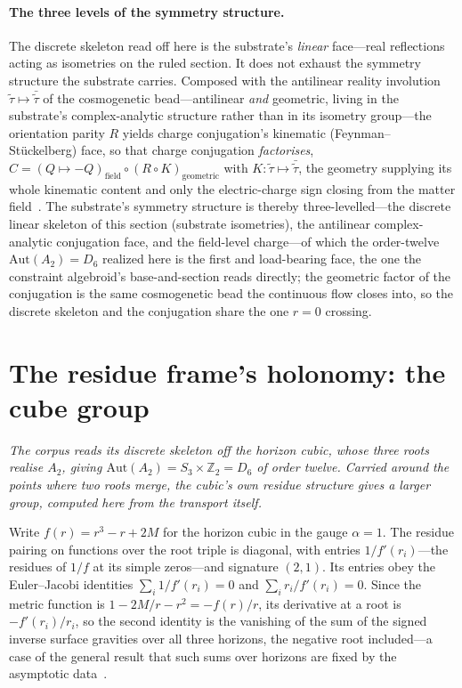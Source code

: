 \documentclass[11pt,a4paper]{article}
\theoremstyle{plain}
\theoremstyle{definition}
\theoremstyle{remark}
\begin{document}
\paragraph{The three levels of the symmetry structure.} The discrete skeleton read off here is the substrate's \emph{linear} face---real reflections acting as isometries on the ruled section. It does not exhaust the symmetry structure the substrate carries. Composed with the antilinear reality involution $\tilde\tau\mapsto\bar{\tilde\tau}$ of the cosmogenetic bead---antilinear \emph{and} geometric, living in the substrate's complex-analytic structure rather than in its isometry group---the orientation parity $R$ yields charge conjugation's kinematic (Feynman--St\"uckelberg) face, so that charge conjugation \emph{factorises}, $C=(Q\mapsto-Q)_{\mathrm{field}}\circ(R\circ K)_{\mathrm{geometric}}$ with $K:\tilde\tau\mapsto\bar{\tilde\tau}$, the geometry supplying its whole kinematic content and only the electric-charge sign closing from the matter field~\cite{JanzenBoundary,JanzenMatter}. The substrate's symmetry structure is thereby three-levelled---the discrete linear skeleton of this section (substrate isometries), the antilinear complex-analytic conjugation face, and the field-level charge---of which the order-twelve $\mathrm{Aut}(A_2)=D_6$ realized here is the first and load-bearing face, the one the constraint algebroid's base-and-section reads directly; the geometric factor of the conjugation is the same cosmogenetic bead the continuous flow closes into, so the discrete skeleton and the conjugation share the one $r=0$ crossing.

\section{The residue frame's holonomy: the cube group}\label{sec:weyl-a3}

\emph{The corpus reads its discrete skeleton off the horizon cubic, whose three roots realise $A_{2}$, giving
$\mathrm{Aut}(A_{2})=S_{3}\times\mathbb{Z}_{2}=D_{6}$ of order twelve. Carried around the points where two
roots merge, the cubic's own residue structure gives a larger group, computed here from the transport
itself.}

Write $f(r)=r^{3}-r+2M$ for the horizon cubic in the gauge $\alpha=1$. The residue pairing on functions over the
root triple is diagonal, with entries $1/f'(r_{i})$---the residues of $1/f$ at its simple zeros---and signature
$(2,1)$. Its entries obey the Euler--Jacobi identities $\sum_{i}1/f'(r_{i})=0$ and $\sum_{i}r_{i}/f'(r_{i})=0$.
Since the metric function is $1-2M/r-r^{2}=-f(r)/r$, its derivative at a root is $-f'(r_{i})/r_{i}$, so the
second identity is the vanishing of the sum of the signed inverse surface gravities over all three horizons, the
negative root included---a case of the general result that such sums over horizons are fixed by the asymptotic
data~\cite{ZhaoLu2024}.
\end{document}
